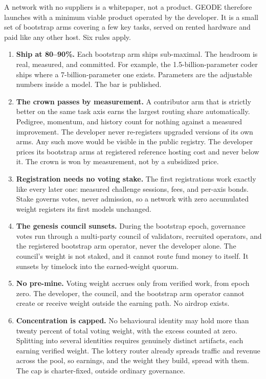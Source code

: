\documentclass[11pt]{article}
\begin{document}
A network with no suppliers is a whitepaper, not a product. GEODE
therefore launches with a minimum viable product operated by the
developer. It is a small set of bootstrap arms covering a few key
tasks, served on rented hardware and paid like any other host. Six
rules apply.

\begin{enumerate}
    \item \textbf{Ship at 80--90\%.} Each bootstrap arm ships
          sub-maximal. The headroom is real, measured, and committed. For
          example, the 1.5-billion-parameter coder ships where a
          7-billion-parameter one exists. Parameters are the adjustable
          numbers inside a model. The bar is published.
    \item \textbf{The crown passes by measurement.} A contributor arm
          that is strictly better on the same task axis earns the largest
          routing share automatically. Pedigree, momentum, and history
          count for nothing against a measured improvement. The developer
          never re-registers upgraded versions of its own arms. Any such
          move would be visible in the public registry. The developer
          prices its bootstrap arms at registered reference hosting cost
          and never below it. The crown is won by measurement, not by a
          subsidized price.
    \item \textbf{Registration needs no voting stake.} The first
          registrations work exactly like every later one: measured
          challenge sessions, fees, and per-axis bonds. Stake governs
          votes, never admission, so a network with zero accumulated
          weight registers its first models unchanged.
    \item \textbf{The genesis council sunsets.} During the bootstrap
          epoch, governance votes run through a multi-party council of
          validators, recruited operators, and the registered bootstrap arm
          operator, never the developer alone. The council's weight is
          not staked, and it cannot route fund money to itself. It sunsets
          by timelock into the earned-weight quorum.
    \item \textbf{No pre-mine.} Voting weight accrues only from
          verified work, from epoch zero. The developer, the council, and
          the bootstrap arm operator cannot create or receive weight
          outside the earning path. No airdrop exists.
    \item \textbf{Concentration is capped.} No behavioural identity
          may hold more than twenty percent of total voting weight, with
          the excess counted at zero. Splitting into several identities
          requires genuinely distinct artifacts, each earning verified
          weight. The lottery router already spreads traffic and revenue
          across the pool, so earnings, and the weight they build,
          spread with them. The cap is charter-fixed, outside ordinary
          governance.
\end{enumerate}
\end{document}
